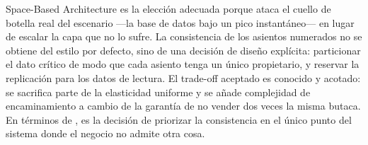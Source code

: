 Space-Based Architecture es la elección adecuada porque ataca el cuello de botella real del escenario ---la base de datos bajo un pico instantáneo--- en lugar de escalar la capa que no lo sufre. La consistencia de los asientos numerados no se obtiene del estilo por defecto, sino de una decisión de diseño explícita: particionar el dato crítico de modo que cada asiento tenga un único propietario, y reservar la replicación para los datos de lectura. El trade-off aceptado es conocido y acotado: se sacrifica parte de la elasticidad uniforme y se añade complejidad de encaminamiento a cambio de la garantía de no vender dos veces la misma butaca. En términos de \textcite{brewer2012cap}, es la decisión de priorizar la consistencia en el único punto del sistema donde el negocio no admite otra cosa.
